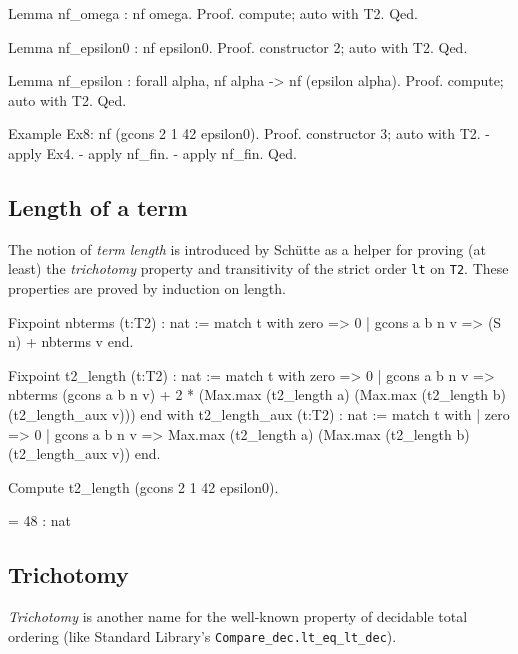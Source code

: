 {\begin{Coqsrc}
Lemma nf_omega : nf omega.
Proof.  compute; auto with T2. Qed.

Lemma nf_epsilon0 : nf epsilon0.
Proof. constructor 2; auto with T2. Qed.

Lemma nf_epsilon : forall alpha, nf alpha -> nf (epsilon alpha).
Proof. compute; auto with T2. Qed.

Example Ex8: nf (gcons 2 1 42 epsilon0).
Proof.
  constructor 3; auto with T2.
  - apply Ex4.
  - apply nf_fin.
  - apply nf_fin.
Qed.
\end{Coqsrc}


\subsection{Length of a term}

The notion of \emph{term length} is introduced by Schütte as a helper for proving (at least) the \emph{trichotomy} property and transitivity of the strict order \texttt{lt} on \texttt{T2}. These properties are proved by induction on length.

\begin{Coqsrc}
Fixpoint nbterms (t:T2) : nat :=
  match t with zero => 0
             | gcons a b n v => (S n) + nbterms v
  end.

Fixpoint t2_length (t:T2) : nat :=
  match t  with 
    zero => 0
  | gcons a b n v => 
       nbterms (gcons a b n v) + 
      2 * (Max.max (t2_length a)
                              (Max.max (t2_length b) 
                                                (t2_length_aux v)))
  end
with t2_length_aux (t:T2) : nat :=
 match t with 
 | zero => 0
  | gcons a b n v =>
           Max.max (t2_length a) 
                            (Max.max (t2_length b) (t2_length_aux v))
 end.
\end{Coqsrc}

\begin{Coqsrc}
Compute t2_length (gcons 2 1 42 epsilon0).
\end{Coqsrc}

\begin{Coqanswer}
 = 48 : nat
\end{Coqanswer}

\subsection{Trichotomy}

\emph{Trichotomy} is another name for the well-known property of decidable total ordering (like Standard Library's \texttt{Compare\_dec.lt\_eq\_lt\_dec}).

}
